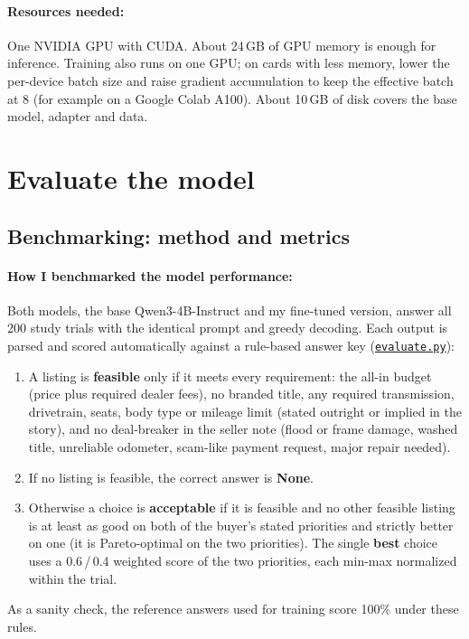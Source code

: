 \documentclass[11pt]{article}
\newcommand{\code}[1]{\texttt{\small #1}}
\newcommand{\repourl}{https://github.com/rajdeeepm/ai-car-advisor}
\newcommand{\gh}[2]{\href{\repourl/blob/main/#1}{\code{#2}}}
\begin{document}
\paragraph{Resources needed:} One NVIDIA GPU with CUDA. About 24\,GB of GPU memory is enough for
inference. Training also runs on one GPU; on cards with less memory, lower the per-device batch
size and raise gradient accumulation to keep the effective batch at 8 (for example on a Google
Colab A100). About 10\,GB of disk covers the base model, adapter and data.

\section{Evaluate the model}\label{part:eval}

\subsection{Benchmarking: method and metrics}\label{sec:bench}

\paragraph{How I benchmarked the model performance:} Both models, the base Qwen3-4B-Instruct and my fine-tuned version,
answer all 200 study trials with the identical prompt and greedy decoding. Each output is parsed
and scored automatically against a rule-based answer key (\gh{evaluate.py}{evaluate.py}):
\begin{enumerate}
  \item A listing is \textbf{feasible} only if it meets every requirement: the all-in budget (price
  plus required dealer fees), no branded title, any required transmission, drivetrain, seats, body
  type or mileage limit (stated outright or implied in the story), and no deal-breaker in the
  seller note (flood or frame damage, washed title, unreliable odometer, scam-like payment request,
  major repair needed).
  \item If no listing is feasible, the correct answer is \textbf{None}.
  \item Otherwise a choice is \textbf{acceptable} if it is feasible and no other feasible listing is
  at least as good on both of the buyer's stated priorities and strictly better on one (it is
  Pareto-optimal on the two priorities). The single \textbf{best} choice uses a 0.6\,/\,0.4 weighted
  score of the two priorities, each min-max normalized within the trial.
\end{enumerate}
As a sanity check, the reference answers used for training score 100\% under these rules.
\end{document}
